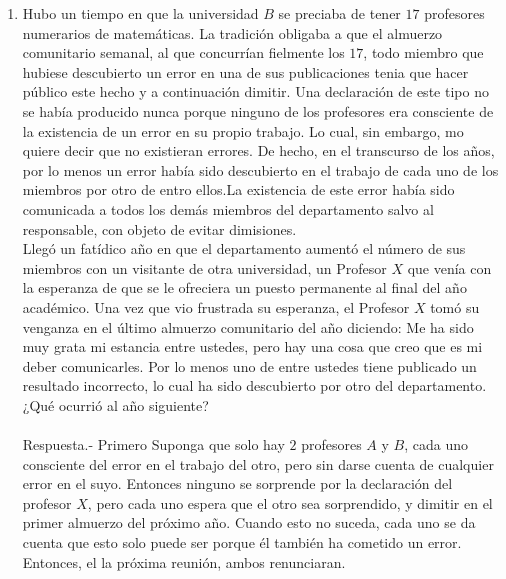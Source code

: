 \begin{enumerate}[\bfseries 1.]
       \item Hubo un tiempo en que la universidad $B$ se preciaba de tener $17$ profesores numerarios de matemáticas. La tradición obligaba a que el almuerzo comunitario semanal, al que concurrían fielmente los $17$, todo miembro que hubiese descubierto un error en una de sus publicaciones tenia que hacer público este hecho y a continuación dimitir. Una declaración de este tipo no se había producido nunca porque ninguno de los profesores era consciente de la existencia de un error en su propio trabajo. Lo cual, sin embargo, mo quiere decir que no existieran errores. De hecho, en el transcurso de los años, por lo menos un error había sido descubierto en el trabajo de cada uno de los miembros por otro de entro ellos.La existencia de este error había sido comunicada a todos los demás miembros del departamento salvo al responsable, con objeto de evitar dimisiones.\\
          Llegó un fatídico año en que el departamento aumentó el número de sus miembros con un visitante de otra universidad, un Profesor $X$ que venía con la esperanza de que se le ofreciera un puesto permanente al final del año académico. Una vez que vio frustrada su esperanza, el Profesor $X$ tomó su venganza en el último almuerzo comunitario del año diciendo: Me ha sido muy grata mi estancia entre ustedes, pero hay una cosa que creo que es mi deber comunicarles. Por lo menos uno de entre ustedes tiene publicado un resultado incorrecto, lo cual ha sido descubierto por otro del departamento. ¿Qué ocurrió al año siguiente?\\\\
          Respuesta.-\; Primero Suponga que solo hay $2$ profesores $A$ y $B$, cada uno consciente del error en el trabajo del otro, pero sin darse cuenta de cualquier error en el suyo. Entonces ninguno se sorprende por la declaración del profesor $X$, pero cada uno espera que el otro sea sorprendido, y dimitir en el primer almuerzo del próximo año. Cuando esto no suceda, cada uno se da cuenta que esto solo puede ser porque él también ha cometido un error. Entonces, el la próxima reunión, ambos renunciaran.\\

\end{enumerate}
